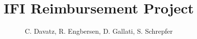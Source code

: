 \documentclass[12pt,a4paper,english,twoside]{book}
\begin{document}

\author{C. Davatz, R. Engbersen, D. Gallati, S. Schrepfer}
\title{IFI Reimbursement Project}


\maketitle

\makeimprint


\cleardoublepage

\cleardoublepage


\tableofcontents

\cleardoublepage
{}


%
%







\end{document}
